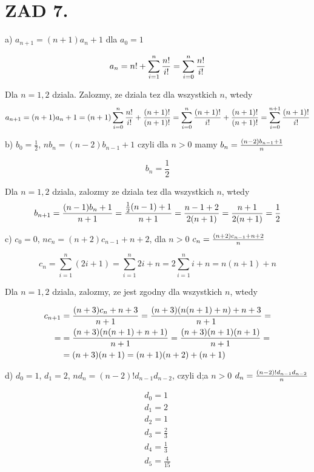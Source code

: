 \documentclass{article}[13pt]
\begin{document}
    \section*{ZAD 7.}
    
    a) $a_{n+1}=(n+1)a_n+1$ dla $a_0=1$

    \begin{align*}
        a_n=n!+\sum\limits_{i=1}^n{n!\over i!}=\sum\limits_{i=0}^n{n!\over i!}
    \end{align*}
    
    Dla $n=1,2$ dziala. Zalozmy, ze dziala tez dla wszystkich $n$, wtedy
    \begin{align*}
        a_{n+1}=(n+1)a_n+1=(n+1)\sum\limits_{i=0}^n{n!\over i!}+{(n+1)!\over(n+1)!}=\sum\limits_{i=0}^n{(n+1)!\over i!}+{(n+1)!\over(n+1)!}=\sum\limits_{i=0}^{n+1}{(n+1)!\over i!}
    \end{align*}

    \medskip
    
    b) $b_0=\frac12$, $nb_n=(n-2)b_{n-1}+1$ czyli dla $n>0$ mamy $b_n={(n-2)b_{n-1}+1\over n}$

    $$b_n=\frac12$$

    Dla $n=1,2$ dziala, zalozmy ze dziala tez dla wszystkich $n$, wtedy
    \begin{align*}
        b_{n+1}={(n-1)b_{n}+1\over n+1}={\frac12(n-1)+1\over n+1}={n-1+2\over 2(n+1)}={n+1\over 2(n+1)}=\frac12
    \end{align*}

    \medskip

    c) $c_0=0$, $nc_n=(n+2)c_{n-1}+n+2$, dla $n>0$ $c_n={(n+2)c_{n-1}+n+2\over n}$

    $$c_n=\sum\limits_{i=1}^n(2i+1)=\sum\limits_{i=1}^n2i+n=2\sum\limits_{i=1}^ni+n=n(n+1)+n$$

    Dla $n=1,2$ dziala, zalozmy, ze jest zgodny dla wszystkich $n$, wtedy

    \begin{align*}
        c_{n+1}&={(n+3)c_n+n+3\over n+1}={(n+3)(n(n+1)+n)+n+3\over n+1}=\\=
        &={(n+3)(n(n+1)+n+1)\over n+1}={(n+3)(n+1)(n+1)\over n+1}=\\
        &=(n+3)(n+1)=(n+1)(n+2)+(n+1)
    \end{align*}

    \medskip

    d) $d_0=1$, $d_1=2$, $nd_n=(n-2)!d_{n-1}d_{n-2}$, czyli d;a $n>0$ $d_n={(n-2)!d_{n-1}d_{n-2}\over n}$

    \begin{align*}
        d_0=1\\
        d_1=2\\
        d_2=1\\
        d_3=\frac23\\
        d_4=\frac13\\
        d_5=\frac4{15}
    \end{align*}
\end{document}
